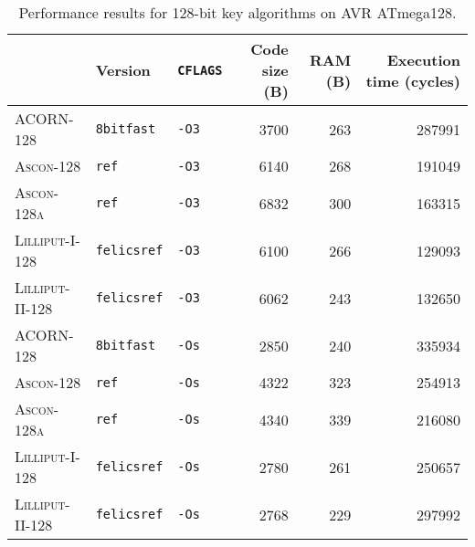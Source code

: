 
\begin{table}[H]
  \centering
  \begin{tabular}{l|l|l||r|r|r}
      \textbf{}                & \textbf{Version}   & \textbf{\texttt{CFLAGS}} & \textbf{Code size (B)} & \textbf{RAM (B)} & \textbf{Execution time (cycles)} \\ \hline
      \textsc{ACORN-128}       & \texttt{8bitfast}  & \texttt{-O3}             &                   3700 &              263 &                           287991 \\ \hline
      \textsc{Ascon-128}       & \texttt{ref}       & \texttt{-O3}             &                   6140 &              268 &                           191049 \\ \hline
      \textsc{Ascon-128a}      & \texttt{ref}       & \texttt{-O3}             &                   6832 &              300 &                           163315 \\ \hline
      \textsc{Lilliput-I-128}  & \texttt{felicsref} & \texttt{-O3}             &                   6100 &              266 &                           129093 \\ \hline
      \textsc{Lilliput-II-128} & \texttt{felicsref} & \texttt{-O3}             &                   6062 &              243 &                           132650 \\ \hline
      \textsc{ACORN-128}       & \texttt{8bitfast}  & \texttt{-Os}             &                   2850 &              240 &                           335934 \\ \hline
      \textsc{Ascon-128}       & \texttt{ref}       & \texttt{-Os}             &                   4322 &              323 &                           254913 \\ \hline
      \textsc{Ascon-128a}      & \texttt{ref}       & \texttt{-Os}             &                   4340 &              339 &                           216080 \\ \hline
      \textsc{Lilliput-I-128}  & \texttt{felicsref} & \texttt{-Os}             &                   2780 &              261 &                           250657 \\ \hline
      \textsc{Lilliput-II-128} & \texttt{felicsref} & \texttt{-Os}             &                   2768 &              229 &                           297992 \\ \hline
  \end{tabular}
  \caption{Performance results for 128-bit key algorithms on AVR ATmega128.}
  \label{table:results/128-avr}
\end{table}

